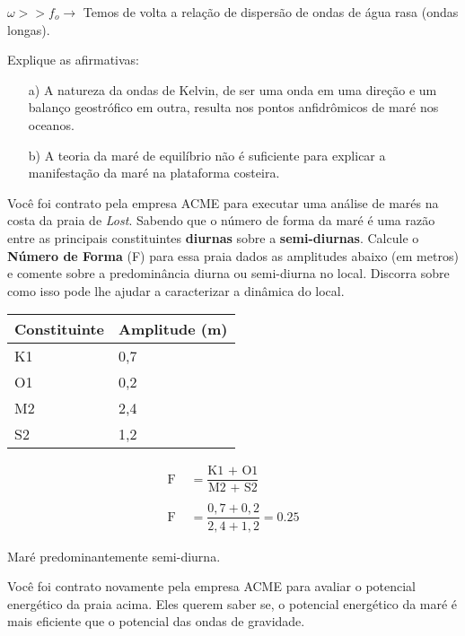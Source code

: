 \documentclass[letterpaper,portuguese,12pt,pdftex]{exam}
\begin{document}
\begin{questions}
\begin{parts}
\begin{solution}
\raggedright
  $\omega >> f_o \rightarrow$ Temos de volta a relação de dispersão de ondas de
  água rasa (ondas longas).\\
\end{solution}
\end{parts}

\question[2]
Explique as afirmativas:
\begin{itemize}
  \item[a)] A natureza da ondas de Kelvin, de ser uma onda em uma direção e um
        balanço geostrófico em outra, resulta nos pontos anfidrômicos de maré
        nos oceanos.
  \item[b)] A teoria da maré de equilíbrio não é suficiente para explicar a
            manifestação da maré na plataforma costeira.
\end{itemize}

\question[3]
Você foi contrato pela empresa ACME\circledR{} para executar uma análise de
marés na costa da praia de {\it Lost}.  Sabendo que o número de forma da maré é uma
razão entre as principais constituintes {\bf diurnas} sobre a
{\bf semi-diurnas}. Calcule o {\bf Número de Forma} (F) para essa praia dados as
amplitudes abaixo (em metros) e comente sobre a predominância diurna ou
semi-diurna no local.  Discorra sobre como isso pode lhe ajudar a caracterizar
a dinâmica do local.

\begin{center}
\begin{tabular}{ll}
Constituinte & Amplitude (m)\\
\hline
K1 & 0,7 \\
O1 & 0,2 \\
M2 & 2,4 \\
S2 & 1,2 \\
\hline
\end{tabular}
\end{center}


\begin{solution}
  \begin{align*}
    \text{F} &= \dfrac{\text{K1 + O1}}{\text{M2 + S2}} \\
    \quad \\
    \text{F} &= \dfrac{0,7 + 0,2}{2,4 + 1,2} = 0.25
  \end{align*}

  Maré predominantemente semi-diurna.
\end{solution}

\question[3]
Você foi contrato novamente pela empresa ACME\circledR{} para avaliar o
potencial energético da praia acima.  Eles querem saber se, o potencial
energético da maré é mais eficiente que o potencial das ondas de gravidade.


\end{questions}
\end{document}
